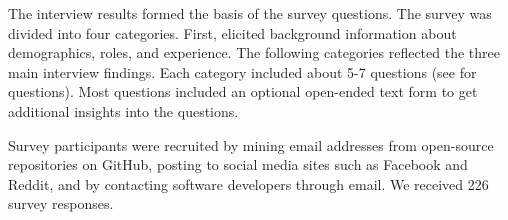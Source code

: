The interview results formed the basis of the survey questions. The survey was divided into four categories. First, elicited background information about demographics, roles, and experience. The following categories reflected the three main interview findings. Each category included about 5-7 questions (see \cite{companion_site} for questions). Most questions included an optional open-ended text form to get additional insights into the questions. 

Survey participants were recruited by mining email addresses from open-source repositories on GitHub, posting to social media sites such as Facebook and Reddit, and by contacting software developers through email. We received 226 survey responses.